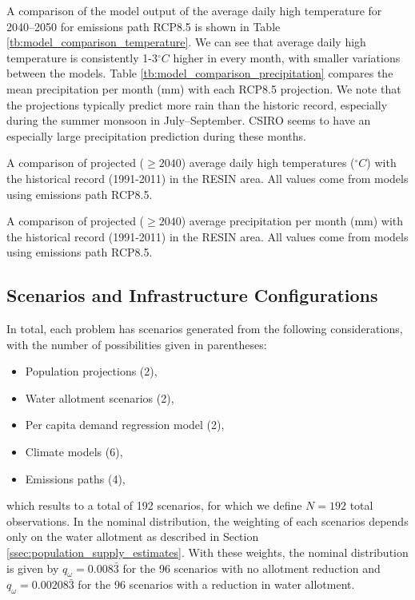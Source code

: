 \documentclass[11pt]{article}
\theoremstyle{plain}
\theoremstyle{definition}
\theoremstyle{remark}
\begin{document}
A comparison of the model output of the average daily high temperature for 2040--2050 for emissions path RCP8.5 is shown in Table \ref{tb:model_comparison_temperature}.
We can see that average daily high temperature is consistently 1-3$^\circ C$ higher in every month, with smaller variations between the models.
Table \ref{tb:model_comparison_precipitation} compares the mean precipitation per month (mm) with each RCP8.5 projection.
We note that the projections typically predict more rain than the historic record, especially during the summer monsoon in July--September.
CSIRO seems to have an especially large precipitation prediction during these months.

\begin{table}
	\footnotesize
	\caption{
		A comparison of projected ($\geq 2040$) average daily high temperatures ($^\circ C$) with the historical record (1991-2011) in the RESIN area.
		All values come from models using emissions path RCP8.5.
	}
		\label{tb:model_comparison_temperature}
\end{table}

\begin{table}
	\footnotesize
	\caption{
		A comparison of projected ($\geq 2040$) average precipitation per month (mm) with the historical record (1991-2011) in the RESIN area.
		All values come from models using emissions path RCP8.5.
	}
	\label{tb:model_comparison_precipitation}
\end{table}


\subsection{Scenarios and Infrastructure Configurations}

In total, each problem has scenarios generated from the following considerations, with the number of possibilities given in parentheses:
\begin{itemize}
	\item Population projections (2),
	\item Water allotment scenarios (2),
	\item Per capita demand regression model (2),
	\item Climate models (6),
	\item Emissions paths (4),
\end{itemize}
which results to a total of 192 scenarios, for which we define $N= 192$ total observations.
In the nominal distribution, the weighting of each scenarios depends only on the water allotment as described in Section \ref{ssec:population_supply_estimates}.
With these weights, the nominal distribution is given by $q_\omega = 0.008\bar{3}$ for the 96 scenarios with no allotment reduction and $q_\omega = 0.00208\bar{3}$ for the 96 scenarios with a reduction in water allotment.
\end{document}
